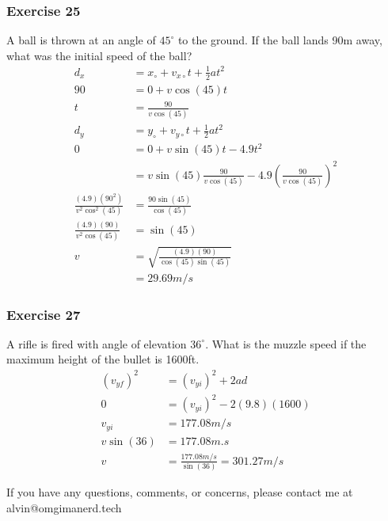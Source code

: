 \documentclass{math}
\begin{document}
\subsubsection*{Exercise 25}
A ball is thrown at an angle of \( 45^{\circ} \) to the ground. If the ball
lands 90m away, what was the initial speed of the ball?
\begin{align*}
  d_x &= x_{\circ}+v_{x\circ}t+\frac{1}{2}at^2 \\
  90 &= 0+v\cos(45)t \\
  t &= \frac{90}{v\cos(45)} \\
  d_y &= y_{\circ}+v_{y\circ}t+\frac{1}{2}at^2 \\
  0 &= 0+v\sin(45)t-4.9t^2 \\
  &= v\sin(45)\frac{90}{v\cos(45)}-4.9(\frac{90}{v\cos(45)})^2 \\
  \frac{(4.9)(90^2)}{v^2\cos^2(45)} &= \frac{90\sin(45)}{\cos(45)} \\
  \frac{(4.9)(90)}{v^2\cos(45)} &= \sin(45) \\
  v &= \sqrt{\frac{(4.9)(90)}{\cos(45)\sin(45)}} \\
  &= 29.69m/s
\end{align*}

\subsubsection*{Exercise 27}
A rifle is fired with angle of elevation \( 36^{\circ} \). What is the muzzle
speed if the maximum height of the bullet is 1600ft.
\begin{align*}
  (v_{yf})^2 &= (v_{yi})^2+2ad \\
  0 &= (v_{yi})^2-2(9.8)(1600) \\
  v_{yi} &= 177.08m/s \\
  v\sin(36) &= 177.08m.s \\
  v &= \frac{177.08m/s}{\sin(36)} = 301.27m/s
\end{align*}

\begin{center}
  If you have any questions, comments, or concerns, please contact me at
  alvin@omgimanerd.tech
\end{center}
\end{document}
